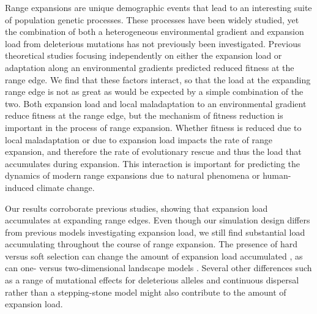 Range expansions are unique demographic events that lead to an interesting suite of population genetic processes. These processes have been widely studied, yet the combination of both a heterogeneous environmental gradient and expansion load from deleterious mutations has not previously been investigated. Previous theoretical studies focusing independently on either the expansion load or adaptation along an environmental gradients predicted reduced fitness at the range edge. We find that these factors interact, so that the load at the expanding range edge is not as great as would be expected by a simple combination of the two. Both expansion load and local maladaptation to an environmental gradient reduce fitness at the range edge, but the mechanism of fitness reduction is important in the process of range expansion. Whether fitness is reduced due to local maladaptation or due to expansion load impacts the rate of range expansion, and therefore the rate of evolutionary rescue and thus the load that accumulates during expansion. This interaction is important for predicting the dynamics of modern range expansions due to natural phenomena or human-induced climate change. 

Our results corroborate previous studies, showing that expansion load accumulates at expanding range edges. Even though our simulation design differs from previous models investigating expansion load, we still find substantial load accumulating throughout the course of range expansion. The presence of hard versus soft selection can change the amount of expansion load accumulated \citep{Peischl:2013, Peischl:2015}, as can one- versus two-dimensional landscape models \citep{Peischl:2013}. Several other differences such as a range of mutational effects for deleterious alleles and continuous dispersal rather than a stepping-stone model might also contribute to the amount of expansion load.


